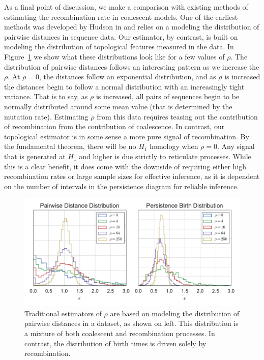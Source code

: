 As a final point of discussion, we make a comparison with existing methods of estimating the recombination rate in coalescent models.
One of the earliest methods was developed by Hudson in \cite{Hudson:1987fo} and relies on a modeling the distribution of pairwise distances in sequence data.
Our estimator, by contrast, is built on modeling the distribution of topological features measured in the data.
In Figure~\ref{fig:estimator_comparison} we show what these distributions look like for a few values of $\rho$.
The distribution of pairwise distances follows an interesting pattern as we increase the $\rho$.
At $\rho=0$, the distances follow an exponential distribution, and as $\rho$ is increased the distances begin to follow a normal distribution with an increasingly tight variance.
That is to say, as $\rho$ is increased, all pairs of sequences begin to be normally distributed around some mean value (that is determined by the mutation rate).
Estimating $\rho$ from this data requires teasing out the contribution of recombination from the contribution of coalescence.
In contrast, our topological estimator is in some sense a more pure signal of recombination.
By the fundamental theorem, there will be no $H_1$ homology when $\rho=0$.
Any signal that is generated at $H_1$ and higher is due strictly to reticulate processes.
While this is a clear benefit, it does come with the downside of requiring either high recombination rates or large sample sizes for effective inference, as it is dependent on the number of intervals in the persistence diagram for reliable inference.

\begin{figure}
\centering
\includegraphics[]{fig/parametric_inference/coalescent_sims_fig6.pdf}
\caption[Comparing traditional estimators of $\rho$ to the TDA-estimator]{Traditional estimators of $\rho$ are based on modeling the distribution of pairwise distances in a dataset, as shown on left. This distribution is a mixture of both coalescent and recombination processes. In contrast, the distribution of birth times is driven solely by recombination.}
\label{fig:estimator_comparison}
\end{figure}

